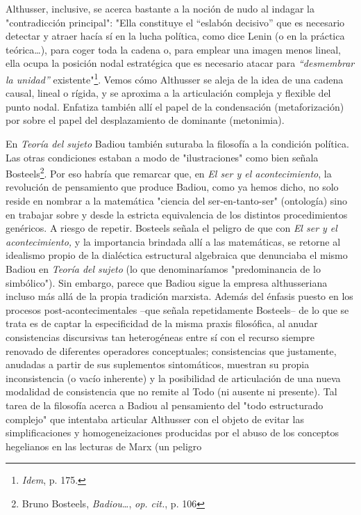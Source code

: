 \documentclass{book}
\begin{document}
Althusser, inclusive, se acerca bastante a la noción de nudo al indagar
la "contradicción principal": "Ella constituye el ``eslabón decisivo''
que es necesario detectar y atraer hacía sí en la lucha política, como
dice Lenin (o en la práctica teórica\ldots), para coger toda la cadena
o, para emplear una imagen menos lineal, ella ocupa la posición nodal
estratégica que es necesario atacar para \emph{``desmembrar la unidad''}
existente"\footnote{\emph{Idem}, p. 175.}. Vemos cómo Althusser se aleja
de la idea de una cadena causal, lineal o rígida, y se aproxima a la
articulación compleja y flexible del punto nodal. Enfatiza también allí
el papel de la condensación (metaforización) por sobre el papel del
desplazamiento de dominante (metonimia).

En \emph{Teoría del sujeto} Badiou también suturaba la filosofía a la
condición política. Las otras condiciones estaban a modo de
"ilustraciones" como bien señala Bosteels\footnote{Bruno Bosteels,
  \emph{Badiou\ldots{}}, \emph{op. cit.}, p. 106}. Por eso habría que
remarcar que, en \emph{El ser y el acontecimiento}, la revolución de
pensamiento que produce Badiou, como ya hemos dicho, no solo reside en
nombrar a la matemática "ciencia del ser-en-tanto-ser" (ontología) sino
en trabajar sobre y desde la estricta equivalencia de los distintos
procedimientos genéricos. A riesgo de repetir. Bosteels señala el
peligro de que con \emph{El ser y el acontecimiento,} y la importancia
brindada allí a las matemáticas, se retorne al idealismo propio de la
dialéctica estructural algebraica que denunciaba el mismo Badiou en
\emph{Teoría del sujeto} (lo que denominaríamos "predominancia de lo
simbólico"). Sin embargo, parece que Badiou sigue la empresa
althusseriana incluso más allá de la propia tradición marxista. Además
del énfasis puesto en los procesos post-acontecimentales --que señala
repetidamente Bosteels-- de lo que se trata es de captar la
especificidad de la misma praxis filosófica, al anudar consistencias
discursivas tan heterogéneas entre sí con el recurso siempre renovado de
diferentes operadores conceptuales; consistencias que justamente,
anudadas a partir de sus suplementos sintomáticos, muestran su propia
inconsistencia (o vacío inherente) y la posibilidad de articulación de
una nueva modalidad de consistencia que no remite al Todo (ni ausente ni
presente). Tal tarea de la filosofía acerca a Badiou al pensamiento del
"todo estructurado complejo" que intentaba articular Althusser con el
objeto de evitar las simplificaciones y homogeneizaciones producidas por
el abuso de los conceptos hegelianos en las lecturas de Marx (un peligro
\end{document}
